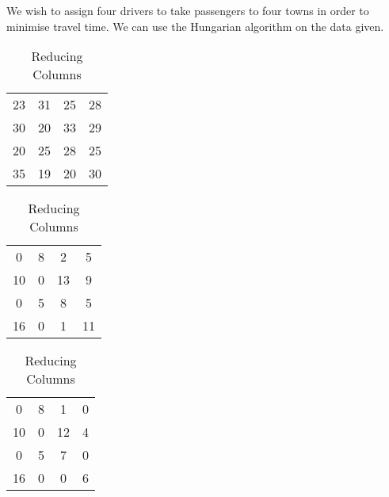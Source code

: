 \begin{subquestions}
\begin{subsubquestions}
We wish to assign four drivers to take passengers to four towns in order to minimise travel time. We can use the Hungarian algorithm on the data given.
\begin{table}[H]
	\begin{minipage}{0.3\textwidth}
		\centering
		\begin{tabular}{cccc}
			23 & 31 & 25 & 28 \\
			30 & 20 & 33 & 29 \\
			20 & 25 & 28 & 25 \\
			35 & 19 & 20 & 30 \\
		\end{tabular}
		\captionsetup{width=1.1\linewidth}
		\caption*{Matrix From question}
	\end{minipage}
	\hspace{20pt}
	\begin{minipage}{0.3\textwidth}
		\centering
		\begin{tabular}{cccc}
			0 & 8 & 2 & 5 \\
		   10 & 0 & 13 & 9 \\
			0 & 5 & 8 & 5 \\
		   16 & 0 & 1 & 11 \\
		\end{tabular}
		\captionsetup{width=1.1\linewidth}
		\caption*{Reducing Rows}
	\end{minipage}
	\hspace{20pt}
	\begin{minipage}{0.3\textwidth}
		\centering
		\begin{tabular}{cccc}
			0 & 8 & 1 & 0 \\
		   10 & 0 & 12 & 4 \\
			0 & 5 & 7 & 0 \\
		   16 & 0 & 0 & 6 \\
		\end{tabular}
		\captionsetup{width=1.1\linewidth}
		\caption*{Reducing Columns} 
	\end{minipage}
	

\end{table}
\end{subsubquestions}
\end{subquestions}
